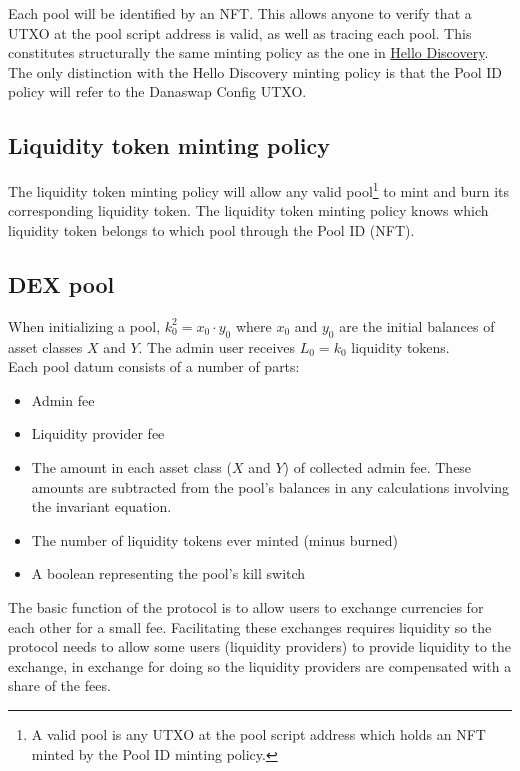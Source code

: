 \documentclass{article}
\begin{document}
Each pool will be identified by an NFT. This allows anyone to verify that a UTXO
at the pool script address is valid, as well as tracing each pool. This
constitutes structurally the same minting policy as the one in
\href{https://github.com/ArdanaLabs/cardano-app-template/blob/master/onchain/src/HelloDiscovery.hs}{
  Hello Discovery}.
The only distinction with the Hello Discovery minting policy is that the Pool ID
policy will refer to the Danaswap Config UTXO.

\subsection{Liquidity token minting policy}

The liquidity token minting policy will allow any valid pool\footnote{
  A valid pool is any UTXO at the pool script address which holds an NFT minted
  by the Pool ID minting policy.
} to mint and burn its corresponding liquidity token. The liquidity token
minting policy knows which liquidity token belongs to which pool through the
Pool ID (NFT).

\subsection{DEX pool}

When initializing a pool, $k_0^2 = x_0 \cdot y_0$ where $x_0$ and $y_0$ are the
initial balances of asset classes $X$ and $Y$. The admin user receives $L_0 =
k_0$ liquidity tokens. \\

Each pool datum consists of a number of parts:
\begin{itemize}
  \item Admin fee
  \item Liquidity provider fee
  \item The amount in each asset class ($X$ and $Y$) of collected admin fee.
    These amounts are subtracted from the pool's balances in any calculations
    involving the invariant equation.
  \item The number of liquidity tokens ever minted (minus burned)
  \item A boolean representing the pool's kill switch
\end{itemize}

The basic function of the protocol is to allow users to exchange
currencies for each other for a small fee.
Facilitating these exchanges requires liquidity so
the protocol needs to allow some users (liquidity providers)
to provide liquidity to the exchange, in exchange for doing so
the liquidity providers are compensated with a share of the fees.
\end{document}
